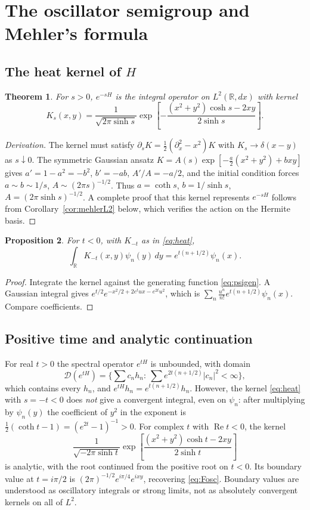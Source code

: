 \documentclass[11pt,reqno]{amsart}
\newtheorem{theorem}{Theorem}[section]
\newtheorem{proposition}[theorem]{Proposition}
\theoremstyle{definition}
\theoremstyle{remark}
\newcommand{\R}{\mathbb R}
\begin{document}
\section{The oscillator semigroup and Mehler's formula}\label{L:mehler}

\subsection{The heat kernel of $H$}
\begin{theorem}\label{thm:heat}
For $s>0$, $e^{-sH}$ is the integral operator on $L^2(\R,dx)$ with kernel
\begin{equation}\label{eq:heat}
K_s(x,y)=\frac1{\sqrt{2\pi\sinh s}}
\exp\left[-\frac{(x^2+y^2)\cosh s-2xy}{2\sinh s}\right].
\end{equation}
\end{theorem}
\begin{proof}[Derivation]
The kernel must satisfy $\partial_sK=\frac12(\partial_x^2-x^2)K$ with
$K_s\to\delta(x-y)$ as $s\downarrow0$. The symmetric Gaussian ansatz
$K=A(s)\exp[-\frac a2(x^2+y^2)+bxy]$ gives
$a'=1-a^2=-b^2$, $b'=-ab$, $A'/A=-a/2$, and the initial condition
forces $a\sim b\sim1/s$, $A\sim(2\pi s)^{-1/2}$. Thus
$a=\coth s$, $b=1/\sinh s$, $A=(2\pi\sinh s)^{-1/2}$.
A complete proof that this kernel represents $e^{-sH}$ follows from
Corollary~\ref{cor:mehlerL2} below, which verifies the action on the
Hermite basis.
\end{proof}

\begin{proposition}\label{prop:onbasis}
For $t<0$, with $K_{-t}$ as in \eqref{eq:heat},
\[
\int_\R K_{-t}(x,y)\psi_n(y)\,dy=e^{t(n+1/2)}\psi_n(x).
\]
\end{proposition}
\begin{proof}
Integrate the kernel against the generating function \eqref{eq:psigen}.
A Gaussian integral gives
$e^{t/2}e^{-x^2/2+2e^tux-e^{2t}u^2}$, which is
$\sum_n\frac{u^n}{n!}e^{t(n+1/2)}\psi_n(x)$. Compare coefficients.
\end{proof}

\subsection{Positive time and analytic continuation}
For real $t>0$ the spectral operator $e^{tH}$ is unbounded, with domain
\[
\mathcal D(e^{tH})=\Big\{\sum c_nh_n:\ \sum e^{2t(n+1/2)}|c_n|^2<\infty\Big\},
\]
which contains every $h_n$, and $e^{tH}h_n=e^{t(n+1/2)}h_n$. However, the
kernel \eqref{eq:heat} with $s=-t<0$ does \emph{not} give a convergent
integral, even on $\psi_n$: after multiplying by $\psi_n(y)$ the
coefficient of $y^2$ in the exponent is
$\frac12(\coth t-1)=(e^{2t}-1)^{-1}>0$. For complex $t$ with
$\operatorname{Re}t<0$, the kernel
\[
\frac1{\sqrt{-2\pi\sinh t}}
\exp\left[\frac{(x^2+y^2)\cosh t-2xy}{2\sinh t}\right]
\]
is analytic, with the root continued from the positive root on
$t<0$. Its boundary value at $t=i\pi/2$ is
$(2\pi)^{-1/2}e^{i\pi/4}e^{ixy}$, recovering \eqref{eq:Fosc}.
Boundary values are understood as oscillatory integrals or strong
limits, not as absolutely convergent kernels on all of $L^2$.
\end{document}

